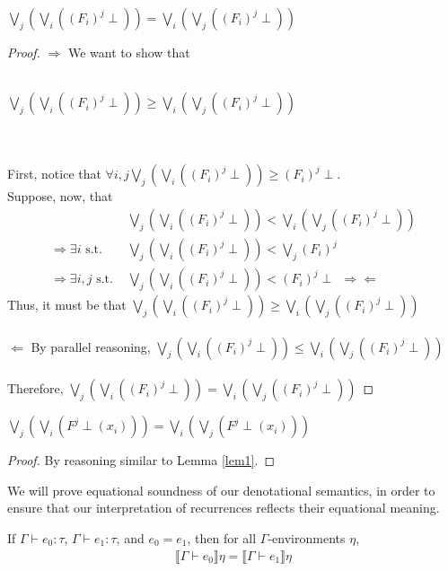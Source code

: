  \begin{lemma} $\bigvee_j(\bigvee_i((F_i)^j \perp))= \bigvee_i(\bigvee_j((F_i)^j \perp))$
 \label{lem1}
 \end{lemma}
 \begin{proof}
 $\Rightarrow$ We want to show that\\ \\ \centerline{$\bigvee_j(\bigvee_i((F_i)^j \perp))
  \geq  \bigvee_i(\bigvee_j((F_i)^j \perp))$} \\ \\ First, notice that $\forall i, j \bigvee_j(\bigvee_i
 ((F_i)^j \perp)) \geq (F_i)^j \perp$. \\
 Suppose, now, that 
 \begin{align*}
 &\bigvee_j(\bigvee_i((F_i)^j \perp)) < \bigvee_i(\bigvee_j((F_i)^j \perp))\\ 
 \Rightarrow \exists i \text{ s.t. \ \  \ } &\bigvee_j(\bigvee_i((F_i)^j \perp)) < \bigvee_j (F_i)^j \\
 \Rightarrow \exists i, j \text{ s.t. } &\bigvee_j(\bigvee_i((F_i)^j \perp)) < (F_i)^j \perp  \ \
 \Rightarrow\Leftarrow
 \end{align*}
 Thus, it must be that $\bigvee_j(\bigvee_i((F_i)^j \perp)) \geq  \bigvee_i(\bigvee_j((F_i)^j \perp))$ \\ \\
 $\Leftarrow$ By parallel reasoning, $\bigvee_j(\bigvee_i((F_i)^j \perp)) \leq  \bigvee_i(\bigvee_j((F_i)^j  \perp))$ \\ \\
 Therefore, $\bigvee_j(\bigvee_i((F_i)^j \perp)) = \bigvee_i(\bigvee_j((F_i)^j \perp))$ 
 \end{proof}
 
 \begin{lemma}
 \label{lem2}
 $\bigvee_j(\bigvee_i(F^j \perp(x_i)))= \bigvee_i(\bigvee_j(F^j \perp(x_i)))$
 \end{lemma}
 \begin{proof} 
 By reasoning similar to Lemma \ref{lem1}. 
 \end{proof}

 We will prove equational soundness of our denotational semantics, in order to ensure that
 our interpretation of recurrences reflects their equational meaning.
  \begin{thm}
  If $\Gamma \vdash e_0 : \tau$, $\Gamma \vdash e_1 : \tau$, and $e_0 = e_1$, then for all $\Gamma$-environments
  $\eta$,   
 \begin{align*}
 \llbracket \Gamma \vdash e_0 \rrbracket \eta 
 = \llbracket \Gamma \vdash e_1 \rrbracket \eta 
 \end{align*} 
 \end{thm}
 
